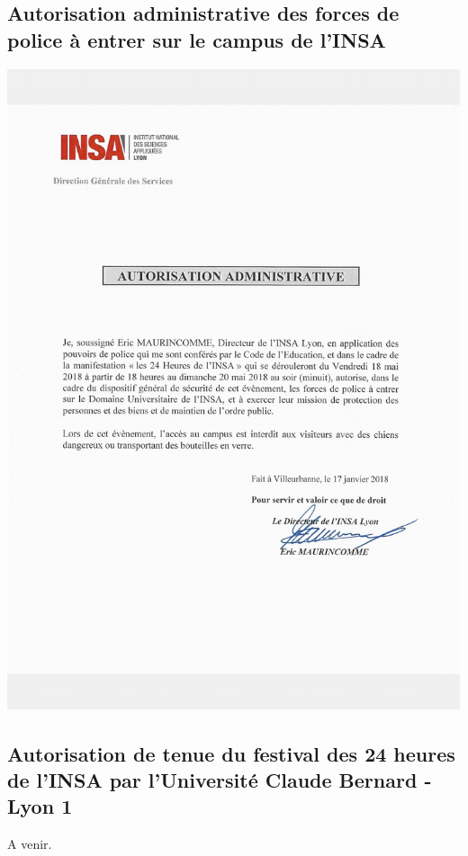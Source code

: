 \documentclass[hidelinks, paper=a4, fontsize=13pt]{report}
\begin{document}
\subsection{Autorisation administrative des forces de police à entrer sur le campus de l’INSA}
\begin{center}
\includegraphics[scale=0.7]{Annexes/Documents/INSAAutorisationPolice}
\end{center}

\subsection{Autorisation de tenue du festival des 24 heures de l'INSA par l'Université Claude Bernard - Lyon 1}
A venir.
\end{document}
